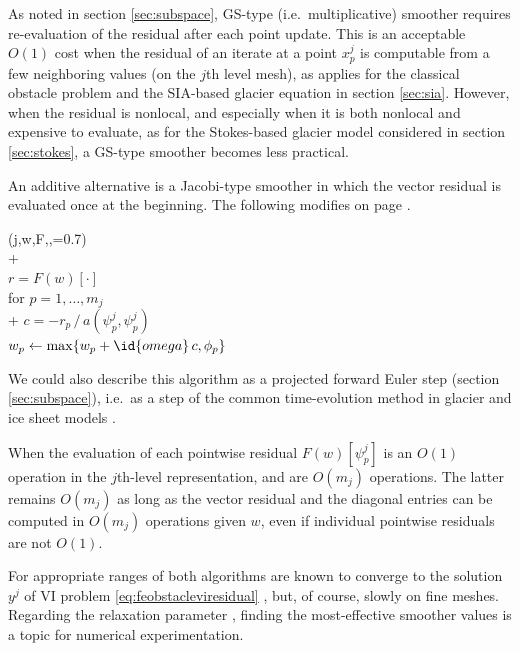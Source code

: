 \documentclass[letterpaper,final,12pt,reqno]{amsart}
\theoremstyle{claim}
\numberwithin{equation}{section}
\numberwithin{figure}{section}
\numberwithin{table}{section}
\numberwithin{theorem}{section}
\begin{document}
As noted in section \ref{sec:subspace}, GS-type (i.e.~multiplicative) smoother requires re-evaluation of the residual after each point update.  This is an acceptable $O(1)$ cost when the residual of an iterate at a point $x_p^j$ is computable from a few neighboring values (on the $j$th level mesh), as applies for the classical obstacle problem and the SIA-based glacier equation in section \ref{sec:sia}.  However, when the residual is nonlocal, and especially when it is both nonlocal and expensive to evaluate, as for the Stokes-based glacier model considered in section \ref{sec:stokes}, a GS-type smoother becomes less practical.

An additive alternative is a Jacobi-type smoother in which the vector residual is evaluated once at the beginning.  The following modifies  on page \pageref{ps:jacobi-sweep}.
\begin{pseudo*} \label{ps:pjacobi-sweep}
(j,w,F,\phi,=0.7)\text{:} \\+
     \\
    $r = F(w)[\cdot]$ \\
    for $p=1,\dots,m_j$ \\+
        $c = -r_p \,\big/\, a(\psi_p^j,\psi_p^j)$ \\
        $w_p \gets \max\{w_p + \id{omega}\,c, \phi_p\}$
\end{pseudo*}
We could also describe this algorithm as a projected forward Euler step (section \ref{sec:subspace}), i.e.~as a step of the common time-evolution method in glacier and ice sheet models \cite[for example]{Winkelmannetal2011}.

When the evaluation of each pointwise residual $F(w)[\psi_p^j]$ is an $O(1)$ operation in the $j$th-level representation,  and  are $O(m_j)$ operations.  The latter remains $O(m_j)$ as long as the vector residual and the diagonal entries can be computed in $O(m_j)$ operations given $w$, even if individual pointwise residuals are not $O(1)$.

For appropriate ranges of  both algorithms are known to converge to the solution $y^j$ of VI problem \eqref{eq:feobstacleviresidual} \cite[Proposition 4.5]{GraeserKornhuber2009}, but, of course, slowly on fine meshes.  Regarding the relaxation parameter , finding the most-effective smoother values is a topic for numerical experimentation.
\end{document}
